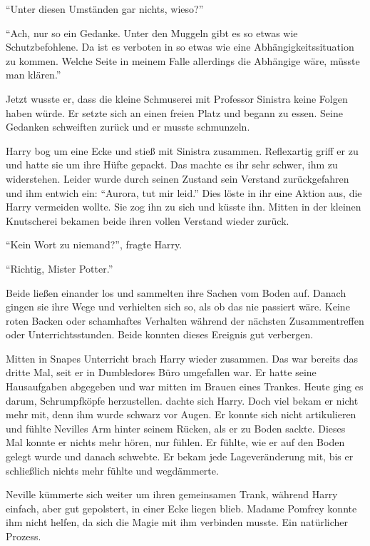 \enquote{Unter diesen Umständen gar nichts, wieso?}

\enquote{Ach, nur so ein Gedanke. Unter den Muggeln gibt es so etwas wie Schutzbefohlene. Da ist es verboten in so etwas wie eine Abhängigkeitssituation zu kommen. Welche Seite in meinem Falle allerdings die Abhängige wäre, müsste man klären.}

Jetzt wusste er, dass die kleine Schmuserei mit Professor Sinistra keine Folgen haben würde. Er setzte sich an einen freien Platz und begann zu essen. Seine Gedanken schweiften zurück und er musste schmunzeln.

\begin{rueckblick}
Harry bog um eine Ecke und stieß mit Sinistra zusammen. Reflexartig griff er zu und hatte sie um ihre Hüfte gepackt. Das machte es ihr sehr schwer, ihm zu widerstehen. Leider wurde durch seinen Zustand sein Verstand zurückgefahren und ihm entwich ein: \enquote{Aurora, tut mir leid.} Dies löste in ihr eine Aktion aus, die Harry vermeiden wollte. Sie zog ihn zu sich und küsste ihn. Mitten in der kleinen Knutscherei bekamen beide ihren vollen Verstand wieder zurück.

\enquote{Kein Wort zu niemand?}, fragte Harry.

\enquote{Richtig, Mister Potter.}

Beide ließen einander los und sammelten ihre Sachen vom Boden auf. Danach gingen sie ihre Wege und verhielten sich so, als ob das nie passiert wäre. Keine roten Backen oder schamhaftes Verhalten während der nächsten Zusammentreffen oder Unterrichtsstunden. Beide konnten dieses Ereignis gut verbergen.
\end{rueckblick}

\onelineback %
\trenn

Mitten in Snapes Unterricht brach Harry wieder zusammen. Das war bereits das dritte Mal, seit er in Dumbledores Büro umgefallen war. Er hatte seine Hausaufgaben abgegeben und war mitten im Brauen eines Trankes. Heute ging es darum, Schrumpfköpfe herzustellen.  dachte sich Harry. Doch viel bekam er nicht mehr mit, denn ihm wurde schwarz vor Augen. Er konnte sich nicht artikulieren und fühlte Nevilles Arm hinter seinem Rücken, als er zu Boden sackte. Dieses Mal konnte er nichts mehr hören, nur fühlen. Er fühlte, wie er auf den Boden gelegt wurde und danach schwebte. Er bekam jede Lageveränderung mit, bis er schließlich nichts mehr fühlte und wegdämmerte.

Neville kümmerte sich weiter um ihren gemeinsamen Trank, während Harry einfach, aber gut gepolstert, in einer Ecke liegen blieb. Madame Pomfrey konnte ihm nicht helfen, da sich die Magie mit ihm verbinden musste. Ein natürlicher Prozess.

